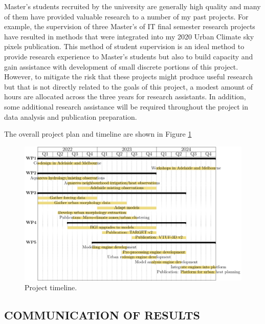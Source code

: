 Master's students recruited by the university are generally high quality and many of them have provided valuable research to a number of my past projects. For example, the supervision of three Master's of IT final semester research projects have resulted in methods that were integrated into my 2020 Urban Climate sky pixels publication\cite{Nice2020}. This method of student supervision is an ideal method to provide research experience to Master's students but also to build capacity and gain assistance with development of small discrete portions of this project. However, to mitigate the risk that these projects might produce useful research but that is not directly related to the goals of this project, a modest amount of hours are allocated across the three years for research assistants. In addition, some additional research assistance will be required throughout the project in data analysis and publication preparation.

The overall project plan and timeline are shown in Figure \ref{fig:timeline}

\begin{figure}[ht]
\centering
\includegraphics[scale=0.70]{DECRA-D-timeline.pdf}
\caption{Project timeline. }
\label{fig:timeline}
\end{figure}


\subsection*{\TitleFont COMMUNICATION OF RESULTS}


